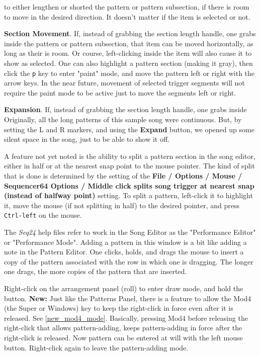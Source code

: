\begin{enumber}
         to either lengthen or shorted the pattern or pattern subsection, if
         there is room to move in the desired direction.
         It doesn't matter if the item is selected or not.
      \item \textbf{Section Movement}.
         If, instead of grabbing the section length handle, one grabs inside
         the pattern or pattern subsection, that item can be moved
         horizontally, as long as their is room.  Or course, left-clicking
         inside the item will also cause it to show as selected.
         One can also highlight a pattern section (making it gray),
         then click the \texttt{p} key to enter "paint" mode, and move the
         pattern left or right with the arrow keys.
         In the near future, movement of selected trigger segments will not
         require the paint mode to be active just to move the segments left or
         right.
      \item \textbf{Expansion}.
         If, instead of grabbing the section length handle, one grabs inside
         Originally, all the long patterns of this sample song were continuous.
         But, by setting the L and R markers, and using the \textbf{Expand}
         button, we opened up some silent space in the song, just to be able
         to show it off.
   \end{enumber}

   A feature not yet noted is the ability to split a pattern section in the
   song editor, either in half or at the nearest snap point to the mouse
   pointer.  The kind of split that is done is determined by the
   setting of the \textbf{File / Options / Mouse / Sequencer64 Options /
   Middle click splits song trigger at nearest snap (instead of halfway point)}
   setting.  To split a pattern, left-click it to highlight it, move
   the mouse (if not splitting in half) to the desired pointer, and press
   \texttt{Ctrl-left} on the mouse.

   The \textsl{Seq24} help files refer to work in the Song Editor as the
   "Performance Editor" or "Performance Mode".  Adding a pattern in this
   window is a bit like adding a note in the Pattern Editor.
   One clicks, holds, and drags the mouse to insert a copy of the pattern
   associated with the row in which one is dragging.  The longer one drags,
   the more copies of the pattern that are inserted.

	Right-click on the arrangement panel (roll) to enter
   draw mode, and hold the button.
   \textbf{New:}
   Just like the Patterns Panel, there is a feature to allow the Mod4 (the
   Super or Windows) key to keep the right-click in force even after it is
   released.  See \ref{new_mod4_mode}.  Basically, pressing Mod4 before
   releasing the right-click that allows pattern-adding, keeps
   pattern-adding in force after the right-click is released.  Now pattern
   can be entered at will with the left mouse button.  Right-click again to
   leave the pattern-adding mode.

